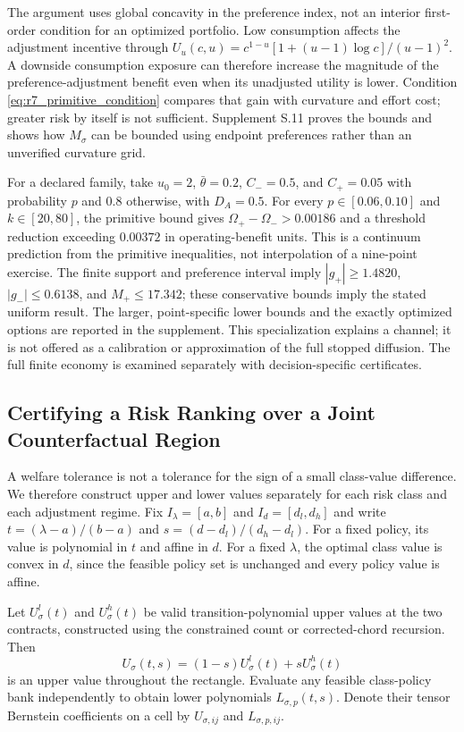 The argument uses global concavity in the preference index, not an interior first-order condition for an optimized portfolio. Low consumption affects the adjustment incentive through
$U_u(c,u)=c^{1-u}[1+(u-1)\log c]/(u-1)^2$.
A downside consumption exposure can therefore increase the magnitude of the preference-adjustment benefit even when its unadjusted utility is lower. Condition \eqref{eq:r7_primitive_condition} compares that gain with curvature and effort cost; greater risk by itself is not sufficient. Supplement S.11 proves the bounds and shows how $M_\sigma$ can be bounded using endpoint preferences rather than an unverified curvature grid.

For a declared family, take $u_0=2$, $\bar\theta=0.2$, $C_-=0.5$, and
$C_+=0.05$ with probability $p$ and $0.8$ otherwise, with $D_A=0.5$.
For every $p\in[0.06,0.10]$ and $k\in[20,80]$, the primitive bound gives
$\Omega_+-\Omega_->0.00186$ and a threshold reduction exceeding $0.00372$ in operating-benefit units. This is a continuum prediction from the primitive inequalities, not interpolation of a nine-point exercise. The finite support and preference interval imply $|g_+|\geq1.4820$, $|g_-|\leq0.6138$, and $M_+\leq17.342$; these conservative bounds imply the stated uniform result. The larger, point-specific lower bounds and the exactly optimized options are reported in the supplement. This specialization explains a channel; it is not offered as a calibration or approximation of the full stopped diffusion. The full finite economy is examined separately with decision-specific certificates.

\subsection{Certifying a Risk Ranking over a Joint Counterfactual Region}
\label{sec:r7_decision}
A welfare tolerance is not a tolerance for the sign of a small class-value difference. We therefore construct upper and lower values separately for each risk class and each adjustment regime. Fix $I_\lambda=[a,b]$ and $I_d=[d_l,d_h]$ and write $t=(\lambda-a)/(b-a)$ and $s=(d-d_l)/(d_h-d_l)$. For a fixed policy, its value is polynomial in $t$ and affine in $d$. For a fixed $\lambda$, the optimal class value is convex in $d$, since the feasible policy set is unchanged and every policy value is affine.

Let $U_\sigma^l(t)$ and $U_\sigma^h(t)$ be valid transition-polynomial upper values at the two contracts, constructed using the constrained count or corrected-chord recursion. Then
\[
 U_\sigma(t,s)=(1-s)U_\sigma^l(t)+sU_\sigma^h(t)
\]
is an upper value throughout the rectangle. Evaluate any feasible class-policy bank independently to obtain lower polynomials $L_{\sigma,p}(t,s)$. Denote their tensor Bernstein coefficients on a cell by $U_{\sigma,ij}$ and $L_{\sigma,p,ij}$.

